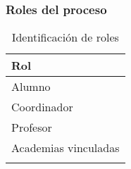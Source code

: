 \subsubsection{Roles del proceso}


\begin{longtable}{|l|}%
		\hline
			\textbf{Rol}\\
		\hline\hline %
			Alumno\\ 
		\hline
		Coordinador\\
		\hline
		Profesor\\
		\hline
		Academias vinculadas\\
		\hline
\caption{Identificación de roles}
\end{longtable}
